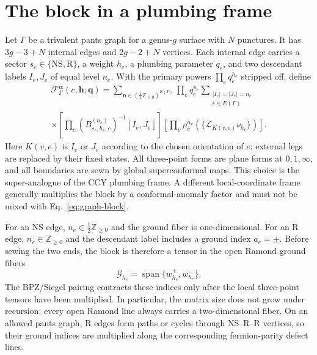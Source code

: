 \documentclass[11pt]{article}
\newcommand{\NS}{\mathrm{NS}}
\newcommand{\R}{\mathrm{R}}
\newcommand{\half}{\tfrac12}
\newcommand{\F}{\mathcal F}
\newcommand{\G}{\mathcal G}
\begin{document}
\section{The block in a plumbing frame}
\label{sec:plumbing-block}

Let $\Gamma$ be a trivalent pants graph for a genus-$g$ surface with $N$
punctures.  It has $3g-3+N$ internal edges and $2g-2+N$ vertices.  Each
internal edge carries a sector $s_e\in\{\NS,\R\}$, a weight $h_e$, a plumbing
parameter $q_e$, and two descendant labels $I_e,J_e$ of equal level $n_e$.
With the primary powers $\prod_e q_e^{h_e}$ stripped off, define
\begin{multline}
 \F_{\Gamma}^{\boldsymbol\alpha}
 (c,\boldsymbol h;\boldsymbol q)
 =\sum_{\boldsymbol n\in(\half\mathbb Z_{\ge0})^{E(\Gamma)}}
 \prod_{e}q_e^{n_e}
 \sum_{\substack{|I_e|=|J_e|=n_e\\ e\in E(\Gamma)}}
 \\[-0.2em]\times
 \left[\prod_e
 (B^{(n_e)}_{s_e,h_e,c})^{-1}[I_e,J_e]\right]
 \left[\prod_{v}\rho_v^{\alpha_v}
       (\{\mathcal L_{K(v,e)}\nu_{h_e}\})\right].
 \label{eq:graph-block}
\end{multline}
Here $K(v,e)$ is $I_e$ or $J_e$ according to the chosen orientation of $e$;
external legs are replaced by their fixed states.  All three-point forms are
plane forms at $0,1,\infty$, and all boundaries are sewn by global
superconformal maps.  This choice is the super-analogue of the CCY plumbing
frame.  A different local-coordinate frame generally multiplies the block by
a conformal-anomaly factor and must not be mixed with Eq.~\eqref{eq:graph-block}.

For an NS edge, $n_e\in\frac12\mathbb Z_{\ge0}$ and the ground fiber is
one-dimensional.  For an R edge, $n_e\in\mathbb Z_{\ge0}$ and the descendant
label includes a ground index $a_e=\pm$.  Before sewing the two ends, the
block is therefore a tensor in the open Ramond ground fibers
\begin{equation}
 \G_{h_e}=\operatorname{span}\{w^+_{h_e},w^-_{h_e}\}.
 \label{eq:r-ground-fiber}
\end{equation}
The BPZ/Siegel pairing contracts these indices only after the local
three-point tensors have been multiplied.  In particular, the matrix size
does not grow under recursion: every open Ramond line always carries a
two-dimensional fiber.  On an allowed pants graph, R edges form paths or
cycles through NS--R--R vertices, so their ground indices are multiplied
along the corresponding fermion-parity defect lines.
\end{document}

